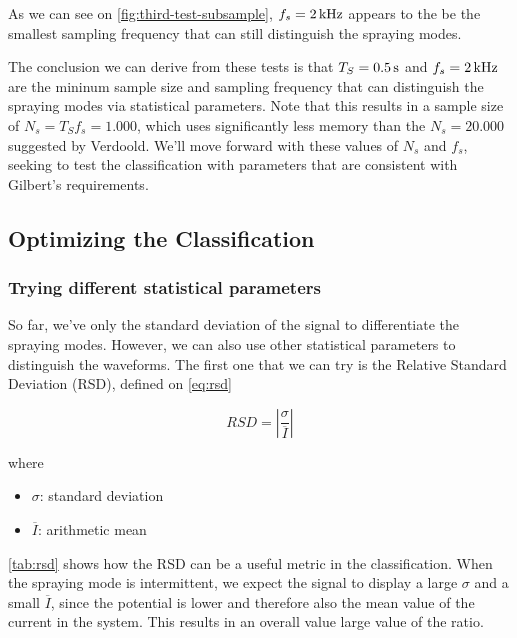 \documentclass[oneside,12pt]{article}
\begin{document}
As we can see on \autoref{fig:third-test-subsample}, $f_s = 2 \,\mathrm{kHz}$ appears to the be the smallest sampling frequency that can still distinguish the spraying  
modes. 

The conclusion we can derive from these tests is that $T_S = 0.5 \,\mathrm{s}$ and $f_s = 2 \,\mathrm{kHz}$ are the mininum sample size and sampling frequency that
can distinguish the spraying modes via statistical parameters. Note that this results in a sample size of $N_s = T_S f_s = 1.000$, which uses 
significantly less memory than the $N_s = 20.000$ suggested by Verdoold. We'll move forward with these values of $N_s$ and $f_s$, seeking to test the classification
with parameters that are consistent with Gilbert's requirements.

\subsection{Optimizing the Classification}

\subsubsection{Trying different statistical parameters}

So far, we've only the standard deviation of the signal to differentiate the spraying modes. However, we can also use other statistical parameters 
to distinguish the waveforms. The first one that we can try is the Relative Standard Deviation (RSD), defined on \autoref{eq:rsd}


\begin{equation} \label{eq:rsd}
    RSD = \left|\frac{\sigma}{\overline{I}}\right|
\end{equation}

where

\begin{itemize}
    \item $\sigma$: standard deviation
    \item $\overline{I}$: arithmetic mean
\end{itemize}

\autoref{tab:rsd} shows how the RSD can be a useful metric in the classification. When the spraying mode is intermittent, we 
expect the signal to display a large $\sigma$ and a small $\overline{I}$, since the potential is lower and therefore also the mean value 
of the current in the system. This results in an overall value large value of the ratio. 
\end{document}
